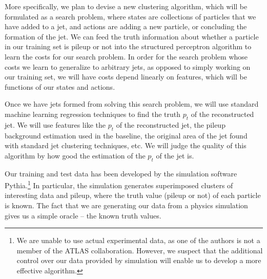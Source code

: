 \documentclass[12pt]{article}
\numberwithin{equation}{section}
\theoremstyle{definition}
\begin{document}
More specifically, we plan to devise a new clustering algorithm, which will be formulated as a search problem, where states are collections of particles that we have added to a jet, and actions are adding a new particle, or concluding the formation of the jet. We can feed the truth information about whether a particle in our training set is pileup or not into the structured perceptron algorithm to learn the costs for our search problem. In order for the search problem whose costs we learn to generalize to arbitrary jets, as opposed to simply working on our training set, we will have costs depend linearly on features, which will be functions of our states and actions.

Once we have jets formed from solving this search problem, we will use standard machine learning regression techniques to find the truth $p_t$ of the reconstructed jet. We will use features like the $p_t$ of the reconstructed jet, the pileup background estimation used in the baseline, the original area of the jet found with standard jet clustering techniques, etc. We will judge the quality of this algorithm by how good the estimation of the $p_t$ of the jet is.

Our training and test data has been developed by the simulation software Pythia.\footnote{We are unable to use actual experimental data, as one of the authors is not a member of the ATLAS collaboration. However, we suspect that the additional control over our data provided by simulation will enable us to develop a more effective algorithm.} In particular, the simulation generates superimposed clusters of interesting data and pileup, where the truth value (pileup or not) of each particle is known. The fact that we are generating our data from a physics simulation gives us a simple oracle -- the known truth values.



\end{document}
